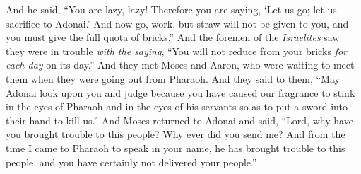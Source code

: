 \begin{biblechapter}
\verse And he said, “You are lazy, lazy! Therefore you are saying, ‘Let us go; let us sacrifice to Adonai.’
\verse And now go, work, but straw will not be given to you, and you must give the full quota of bricks.”
\verse And the foremen of the \textit{Israelites} saw they were in trouble \textit{with the saying}, “You will not reduce from your bricks \textit{for each day} on its day.”
\verse And they met Moses and Aaron, who were waiting to meet them when they were going out from Pharaoh.
\verse And they said to them, “May Adonai look upon you and judge because you have caused our fragrance to stink in the eyes of Pharaoh and in the eyes of his servants so as to put a sword into their hand to kill us.”
\verse And Moses returned to Adonai and said, “Lord, why have you brought trouble to this people? Why ever did you send me?
\verse And from the time I came to Pharaoh to speak in your name, he has brought trouble to this people, and you have certainly not delivered your people.”
\end{biblechapter}

